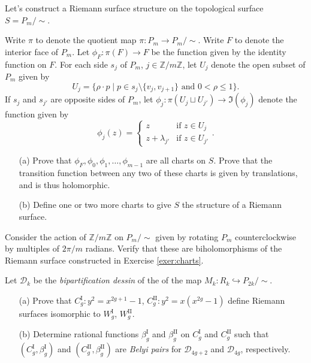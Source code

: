 \documentclass{article}
\begin{document}
\begin{exercise}\label{exer:charts}
Let's construct a Riemann surface structure on the topological surface $S = P_m/{\sim}$.  

Write $\pi$ to denote the quotient map $\pi : P_m \rightarrow P_m/{\sim}$.
Write $F$ to denote the interior face of $P_m$.  Let $\phi_F: \pi(F) \rightarrow F$ be the function given by the identity function on $F$.
For each side $s_j$ of $P_m$, $j\in\mathbb{Z}/m\mathbb{Z}$, let $U_j$ denote the open subset of $P_m$ given by $$U_j = \{\rho \cdot p \mid p\in s_j\setminus\{v_j,v_{j+1}\} \text{ and } 0 < \rho \leq 1 \}.$$ 
If $s_j$ and $s_{j'}$ are opposite sides of $P_m$, let $\phi_j: \pi(U_j \sqcup U_{j'}) \rightarrow \Im(\phi_j)$ denote the function given by 
$$\phi_j(z) = \begin{cases}
    z & \text{if } z\in U_j\\
    z + \lambda_{j'} & \text{if } z \in U_{j'}
\end{cases}.$$

\begin{itemize}
    \item[(a)] Prove that $\phi_F, \phi_0,\phi_1,\dots , \phi_{m-1}$ are all charts on $S$.  Prove that the transition function between any two of these charts is given by translations, and is thus holomorphic.
    \item[(b)] Define one or two more charts to give $S$ the structure of a Riemann surface.
\end{itemize}
\end{exercise}

\begin{exercise}\label{exer:cyclicauts}
Consider the action of $\mathbb{Z}/m\mathbb{Z}$ on $P_m/{\sim}$ given by rotating $P_m$ counterclockwise by multiples of $2\pi/m$ radians. Verify that these are biholomorphisms of the Riemann surface constructed in Exercise \ref{exer:charts}.
\end{exercise}

\begin{exercise}
Let $\mathcal{D}_k$ be the \emph{bipartification dessin} of the of the map $M_k : R_k \hookrightarrow P_{2k}/{\sim}$. 
\begin{enumerate}
    \item[(a)] Prove that $C_g^\text{I} : y^2 = x^{2g+1} - 1$, $C_g^\text{II} : y^2 = x(x^{2g} - 1)$ define Riemann surfaces isomorphic to $W_g^\text{I}$, $W_g^\text{II}$.%
    \item[(b)] Determine rational functions $\beta_g^\text{I}$ and $\beta_g^\text{II}$ on $C_g^\text{I}$ and $C_g^\text{II}$ such that $(C_g^\text{I}, \beta_g^\text{I})$ and $(C_g^\text{II}, \beta_g^\text{II})$ are \emph{Belyi pairs} for $\mathcal{D}_{4g+2}$ and $\mathcal{D}_{4g}$, respectively.
\end{enumerate}
\end{exercise}
\end{document}
